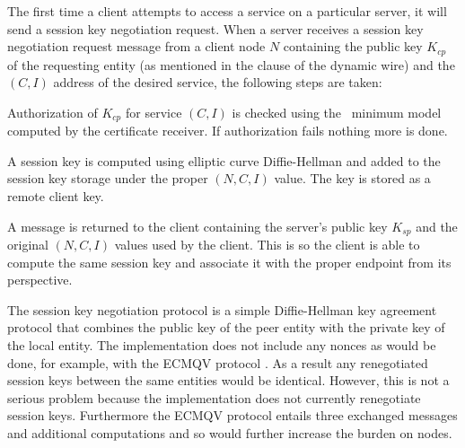 %

The first time a client attempts to access a service on a particular
server, it will send a session key negotiation request. When a server
receives a session key negotiation request message from a client node
$N$ containing the public key $K_{cp}$ of the requesting entity (as
mentioned in the  clause of the dynamic wire) and the $(C, I)$
address of the desired service, the following steps are taken:
\begin{longenum}
\item Authorization of $K_{cp}$ for service $(C, I)$ is checked using
  the \RT\ minimum model computed by the certificate receiver. If
  authorization fails nothing more is done.
\item A session key is computed using elliptic curve Diffie-Hellman and
  added to the session key storage under the proper $(N, C, I)$ value.
  The key is stored as a remote client key.
\item A message is returned to the client containing the server's public
  key $K_{sp}$ and the original $(N, C, I)$ values used by the client.
  This is so the client is able to compute the same session key and
  associate it with the proper endpoint from its perspective.
\end{longenum}

The session key negotiation protocol is a simple Diffie-Hellman key
agreement protocol that combines the public key of the peer entity with
the private key of the local entity. The implementation does not include
any nonces as would be done, for example, with the ECMQV protocol
\cite{ISO-IEC-1170-3:2008}. As a result any renegotiated session keys
between the same entities would be identical. However, this is not a
serious problem because the implementation does not currently
renegotiate session keys. Furthermore the ECMQV protocol entails three
exchanged messages and additional computations and so would further
increase the burden on nodes.

